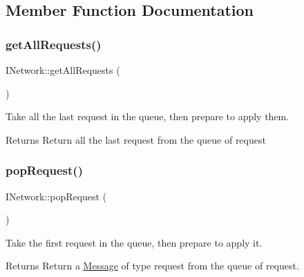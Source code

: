 \subsection{Member Function Documentation}
\mbox{\label{classxzia_1_1INetwork_a0a209aa9651aafb551504d6522c20809}} 
\subsubsection{\texorpdfstring{get\+All\+Requests()}{getAllRequests()}}
{\footnotesize\ttfamily I\+Network\+::get\+All\+Requests (\begin{DoxyParamCaption}{ }\end{DoxyParamCaption})\hspace{0.3cm}{\ttfamily [pure virtual]}}



Take all the last request in the queue, then prepare to apply them. 

\begin{DoxyReturn}{Returns}
Return all the last request from the queue of request 
\end{DoxyReturn}
\mbox{\label{classxzia_1_1INetwork_ae4dc3136855391f174daef8da2bab5d1}} 
\subsubsection{\texorpdfstring{pop\+Request()}{popRequest()}}
{\footnotesize\ttfamily I\+Network\+::pop\+Request (\begin{DoxyParamCaption}{ }\end{DoxyParamCaption})\hspace{0.3cm}{\ttfamily [pure virtual]}}



Take the first request in the queue, then prepare to apply it. 

\begin{DoxyReturn}{Returns}
Return a \mbox{\hyperlink{structxzia_1_1Message}{Message}} of type request from the queue of request. 
\end{DoxyReturn}
\mbox{\label{classxzia_1_1INetwork_a96edde2fedeca124c08a31d4164a1a87}} 
